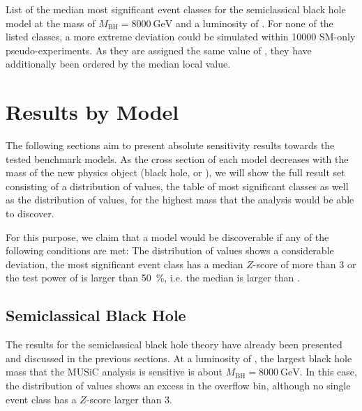 \begin{table}
    \centering
    {
        
    }
    \caption{List of the median most significant event classes for the semiclassical black hole model at the mass of $M_\text{BH} = \SI{8000}{\GeV}$ and a luminosity of \lumiB. For none of the listed classes, a more extreme deviation could be simulated within \num{10000} \ac{SM}-only pseudo-experiments. As they are assigned the same value of \ptilde, they have additionally been ordered by the median local \TS value.}
    \label{tab:bh_table_2016}
\end{table}


\section{Results by Model}
\label{sec:results}

The following sections aim to present absolute sensitivity results towards the tested benchmark models. As the cross section of each model decreases with the mass of the new physics object (black hole, \PSigma or \PWprime), we will show the full result set consisting of a distribution of \ptilde values, the table of most significant classes as well as the distribution of \TSphat values, for the highest mass that the analysis would be able to discover. 

For this purpose, we claim that a model would be discoverable if any of the following conditions are met: The distribution of \ptilde values shows a considerable deviation, the most significant event class has a median $Z$-score of more than \num{3} or the test power of \TSphat is larger than \SI{50}{\percent}, i.e. the median \TSphat is larger than \TSphatcrit.

\subsection{Semiclassical Black Hole}
\label{sec:results_bh}

The results for the semiclassical black hole theory have already been presented and discussed in the previous sections. At a luminosity of \lumiA, the largest black hole mass that the \ac{MUSiC} analysis is sensitive is about $M_\text{BH} = \SI{8000}{\GeV}$. In this case, the distribution of \ptilde values shows an excess in the overflow bin, although no single event class has a $Z$-score larger than \num{3}.

